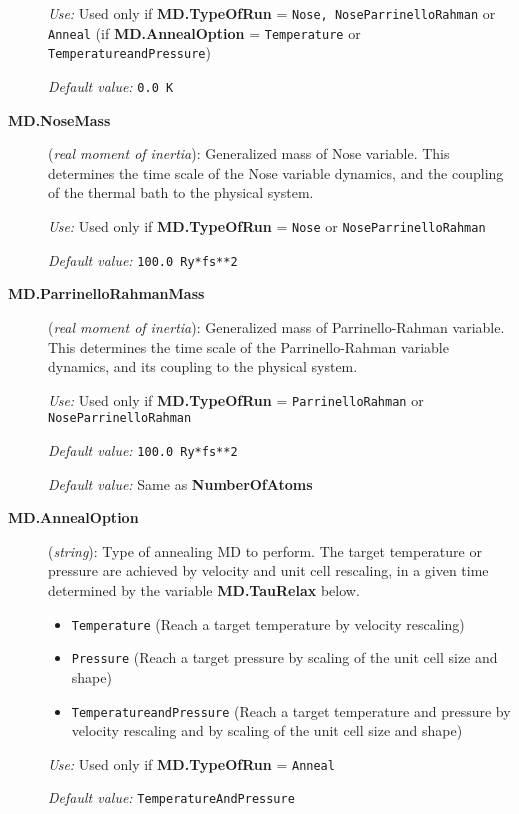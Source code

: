 \documentclass[11pt]{article}
\begin{document}
\begin{description}
{\it Use:} Used only if {\bf MD.TypeOfRun} = {\tt Nose, NoseParrinelloRahman}
or {\tt Anneal} (if {\bf MD.AnnealOption} = {\tt Temperature} or
{\tt TemperatureandPressure})

{\it Default value:} {\tt 0.0 K}



\item[{\bf MD.NoseMass}] ({\it real moment of inertia}):
Generalized mass of Nose variable.
This determines the time scale of the Nose variable
dynamics, and the coupling of the thermal bath to
the physical system.

{\it Use:} Used only if {\bf MD.TypeOfRun} = {\tt Nose} or
{\tt NoseParrinelloRahman}

{\it Default value:} {\tt 100.0 Ry*fs**2}

\item[{\bf MD.ParrinelloRahmanMass}] ({\it real moment of inertia}):
  Generalized mass of Parrinello-Rahman variable.  This determines the
  time scale of the Parrinello-Rahman variable dynamics, and its
  coupling to the physical system.

{\it Use:} Used only if {\bf MD.TypeOfRun} = {\tt ParrinelloRahman}
or {\tt NoseParrinelloRahman}

{\it Default value:} {\tt 100.0 Ry*fs**2}


{\it Default value:}  Same as {\bf NumberOfAtoms}

\item[{\bf MD.AnnealOption}] ({\it string}):
   Type of annealing MD
  to perform. The target temperature or pressure are achieved by
  velocity and unit cell rescaling, in a given time determined by the
  variable {\bf MD.TauRelax} below.
\begin{itemize}
\item {\tt Temperature} (Reach a target temperature by velocity
  rescaling)
\item {\tt Pressure} (Reach a target pressure by scaling of the unit
  cell size and shape)
\item {\tt TemperatureandPressure} (Reach a target temperature and
  pressure by velocity rescaling and by scaling of the unit cell size
  and shape)
\end{itemize}

{\it Use:} Used only if {\bf MD.TypeOfRun} = {\tt Anneal}

{\it Default value:} {\tt TemperatureAndPressure}


\end{description}
\end{document}
